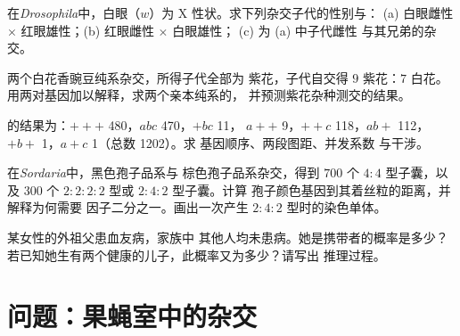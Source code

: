 \begin{exercise}[$\star\star$]\label{exo:b2:meiosis-heredity:8}
在\emph{Drosophila}中，白眼（$w$）为 X 性状。求下列杂交子代的性别与：
(a) 白眼雌性 $\times$ 红眼雄性；(b) 红眼雌性 $\times$ 白眼雄性；
(c) 为 (a) 中子代雌性
与其兄弟的杂交。
\end{exercise}

\begin{exercise}[$\star\star$]\label{exo:b2:meiosis-heredity:9}
两个白花香豌豆纯系杂交，所得子代全部为
紫花，子代自交得 $9$ 紫花：$7$ 白花。
用两对基因加以解释，求两个亲本纯系的，
并预测紫花杂种测交的结果。
\end{exercise}

\begin{exercise}[$\star\star\star$]\label{exo:b2:meiosis-heredity:10}
的结果为：$+++$ 480，$abc$ 470，$+bc$ 11，
$a++$ 9，$++c$ 118，$ab+$ 112，$+b+$ 1，$a+c$ 1（总数 1202）。求
基因顺序、两段图距、并发系数
与干涉。
\end{exercise}

\begin{exercise}[$\star\star\star$]\label{exo:b2:meiosis-heredity:11}
在\emph{Sordaria}中，黑色孢子品系与
棕色孢子品系杂交，得到 $700$ 个 $4 : 4$ 型子囊，以及 $300$ 个
$2 : 2 : 2 : 2$ 型或 $2 : 4 : 2$ 型子囊。计算
孢子颜色基因到其着丝粒的距离，并解释为何需要
因子二分之一。画出一次产生
$2 : 4 : 2$ 型时的染色单体。
\end{exercise}

\begin{exercise}[$\star\star\star$]\label{exo:b2:meiosis-heredity:12}
某女性的外祖父患血友病，家族中
其他人均未患病。她是携带者的概率是多少？
若已知她生有两个健康的儿子，此概率又为多少？请写出
推理过程。
\end{exercise}

\section{问题：果蝇室中的杂交}

